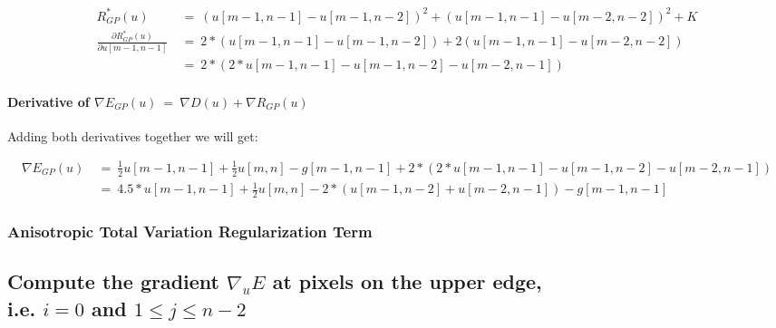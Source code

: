 \documentclass{report}
\begin{document}
\begin{enumerate}[(i)]
						\begin{adjustwidth}{-8em}{}
							\vspace{-0.5cm}
							\begin{align*}
								R_{GP}^*(u) \ & = \ (u[m-1,n-1] - u[m-1,n-2])^2 + (u[m-1,n-1] - u[m-2,n-2])^2 + K \\
								\frac{\partial R_{GP}^*(u)}{\partial u[m-1,n-1]} \ & = \ 2 * (u[m-1,n-1] - u[m-1,n-2]) + 2 (u[m-1,n-1] - u[m-2,n-2]) \\
								& = \ 2 * (2 * u[m-1,n-1] - u[m-1,n-2] - u[m-2,n-1])
							\end{align*}
						\end{adjustwidth}
						\vspace{-0.6cm} \paragraph{Derivative of $\nabla E_{GP}(u) \ = \ \nabla D(u) + \nabla R_{GP}(u)$}
						\startsubsection
							Adding both derivatives together we will get:
						\closesection
						\begin{adjustwidth}{-9em}{}
							\vspace{-0.6cm}
							\begin{align*}
								\nabla E_{GP}(u) \ & = \ \frac{1}{2} u[m-1,n-1]  + \frac{1}{2} u[m,n] - g[m-1,n-1] + 2 * (2 * u[m-1,n-1] - u[m-1,n-2] - u[m-2,n-1]) \\
								& = \ 4.5 * u[m-1,n-1] + \frac{1}{2} u[m,n] - 2*(u[m-1,n-2] + u[m-2,n-1]) - g[m-1,n-1]
							\end{align*}
						\end{adjustwidth}
					\end{enumerate}
				\closesection
			\closesection
			\subsubsection{Anisotropic Total Variation Regularization Term}
			\startsubsection
			\closesection
		\closesection
		
		\subsection{Compute the gradient $\nabla_u E$ at pixels on the upper edge, \\ i.e. $i = 0$ and $1 \leq j \leq n-2$}
		\startsubsection
\end{document}
